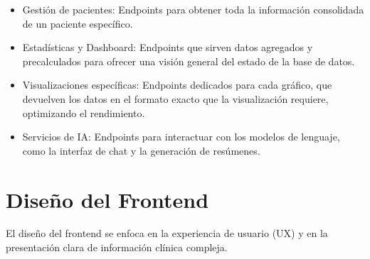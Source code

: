 \begin{itemize}
    \item Gestión de pacientes: Endpoints para obtener toda la información consolidada de un paciente específico.
    \item Estadísticas y Dashboard: Endpoints que sirven datos agregados y precalculados para ofrecer una visión general del estado de la base de datos.
    \item Visualizaciones específicas: Endpoints dedicados para cada gráfico, que devuelven los datos en el formato exacto que la visualización requiere, optimizando el rendimiento.
    \item Servicios de IA: Endpoints para interactuar con los modelos de lenguaje, como la interfaz de chat y la generación de resúmenes.
\end{itemize}



\section{Diseño del Frontend}

El diseño del frontend se enfoca en la experiencia de usuario (UX) y en la presentación clara de información clínica compleja.



